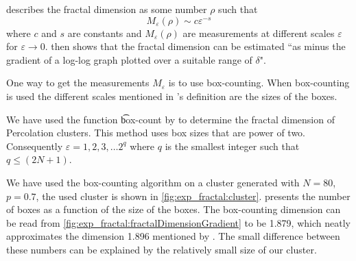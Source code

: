 \textcite{falconer2004fractal} describes the fractal dimension as some number $\rho$ such that
\begin{equation}
	M_\varepsilon(\rho) \sim c\varepsilon^{-s}
\end{equation}
where $c$ and $s$ are constants and $M_\varepsilon(\rho)$ are measurements at different scales $\varepsilon$ for $\varepsilon \to 0$. \citeauthor{falconer2004fractal} then shows that the fractal dimension can be estimated ``as minus the gradient of a log-log graph plotted over a suitable range of $\delta$"\cite{falconer2004fractal}. 

One way to get the measurements $M_\varepsilon$ is to use box-counting. When box-counting is used the different scales mentioned in \citeauthor{falconer2004fractal}'s definition are the sizes of the boxes. 

We have used the function \t{box-count} by \textcite{boxCounting} to determine the fractal dimension of Percolation clusters. This method uses box sizes that are power of two. Consequently $\varepsilon = 1, 2, 3, \dotsc 2^q$ where $q$ is the smallest integer such that $q \leq (2N + 1)$. 

We have used the box-counting algorithm on a cluster generated with $N = 80$, $p = 0.7$, the used cluster is shown in \cref{fig:exp_fractal:cluster}.  presents the number of boxes as a function of the size of the boxes. The box-counting dimension can be read from \cref{fig:exp_fractal:fractalDimensionGradient} to be \num{1.879}, which neatly approximates the dimension \num{1.896} mentioned by \textcite{stauffer1994introduction}. The small difference between these numbers can be explained by the relatively small size of our cluster. 

